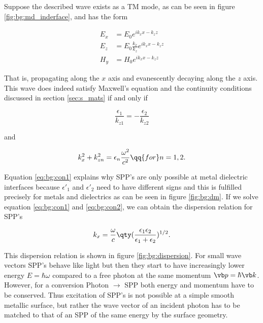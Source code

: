 Suppose the described wave exists as a TM mode, as can be seen in figure \ref{fig:bg:md_inderface}, and has the form 

\begin{equation}
\begin{aligned}
    E_x &= E_0 e^{i k_x x - k_z z} \\
    E_z &= E_0 \frac{k_x}{k_z} e^{i k_x x - k_z z}\\
    H_y &= H_0 e^{i k_x x - k_z z}
\end{aligned}
\end{equation}

That is, propagating along the $x$ axis and evanescently decaying along the $z$ axis. This wave does indeed satisfy Maxwell's equation and the continuity conditions discussed in section \ref{sec:s_mats} if and only if \cite{Maier2007}

\begin{equation} \label{eq:bg:con1}
    \frac{\epsilon_1}{k_{z1}} = - \frac{\epsilon_2}{k_{z2}} 
\end{equation}

and

\begin{equation} \label{eq:bg:con2}
    k_x^2 + k_{zn}^2 = \epsilon_n \frac{\omega^2}{c^2}
    \qq{for}
    n = 1,2.
\end{equation}

Equation \eqref{eq:bg:con1} explains why SPP's are only possible at metal dielectric interfaces because $\epsilon'_1$ and $\epsilon'_2$ need to have different signs and this is fulfilled precisely for metals and dielectrics as can be seen in figure \ref{fig:bg:dm}. If we solve equation \eqref{eq:bg:con1} and \eqref{eq:bg:con2}, we can obtain the dispersion relation for SPP's

\begin{equation}
    k_x = \frac{\omega}{c}
    \qty(\frac{\epsilon_1 \epsilon_2}{\epsilon_1 + \epsilon_2})^{1/2}.
\end{equation}

This dispersion relation is shown in figure \ref{fig:bg:dispersion}. For small wave vectors SPP's behave like light but then they start to have increasingly lower energy $E = \hbar \omega$ compared to a free photon at the same momentum $\vb p = \hbar \vb k$. However, for a conversion Photon $\rightarrow$ SPP both energy and momentum have to be conserved.
Thus excitation of SPP's is not possible at a simple smooth metallic surface, but rather the wave vector of an incident photon has to be matched to that of an SPP of the same energy by the surface geometry.
\\

